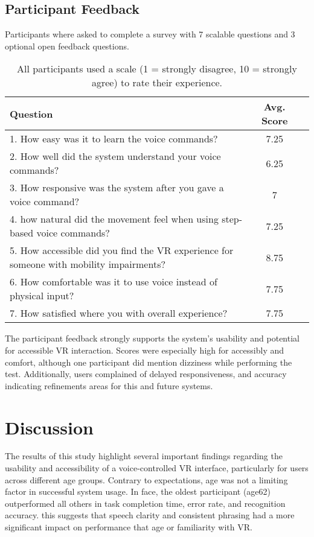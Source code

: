 \documentclass[manuscript, screen, review]{acmart}
\begin{document}
\subsection{Participant Feedback}
Participants where asked to complete a survey with 7 scalable questions and 3 optional open feedback questions.
\begin{table}[htbp]
  \caption{All participants used a scale (1 = strongly disagree, 10 = strongly agree) to rate their experience.}
\label{tab:Feedback}
  \begin{tabular}{lcc}
    \toprule
    Question & Avg. Score\\
    \midrule
    1. How easy was it to learn the voice commands? &  7.25\\
    2. How well did the system understand your voice commands? &  6.25\\
    3. How responsive was the system after you gave a voice command? & 7\\
    4. how natural did the movement feel when using step-based voice commands?&7.25 \\
    5. How accessible did you find the VR experience for someone with mobility impairments? & 8.75\\
    6. How comfortable was it to use voice instead of physical input? &7.75\\
    7. How satisfied where you with overall experience? & 7.75\\
    \bottomrule
  \end{tabular}
\end{table}

The participant feedback strongly supports the system's usability and potential for accessible VR interaction. Scores were especially high for accessibly and comfort, although one participant did mention dizziness while performing the test. Additionally, users complained of delayed responsiveness, and accuracy indicating refinements areas for this and future systems. 
\section{Discussion}
The results of this study highlight several important findings regarding the usability and accessibility of a voice-controlled VR interface, particularly for users across different age groups. Contrary to expectations, age was not a limiting factor in successful system usage. In face, the oldest participant (age62) outperformed all others in task completion time, error rate, and recognition accuracy. this suggests that speech clarity and consistent phrasing had a more significant impact on performance that age or familiarity with VR. 
\end{document}
